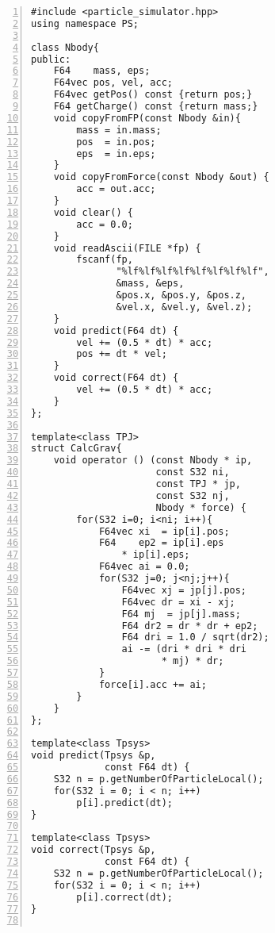 
\begin{lstlisting}[label=code:samplecode,numbers=left,numbersep=5pt,frame=single,basicstyle=\ttfamily]
#include <particle_simulator.hpp>
using namespace PS;

class Nbody{
public:
    F64    mass, eps;
    F64vec pos, vel, acc;
    F64vec getPos() const {return pos;}
    F64 getCharge() const {return mass;}
    void copyFromFP(const Nbody &in){ 
        mass = in.mass;
        pos  = in.pos;
        eps  = in.eps;
    }
    void copyFromForce(const Nbody &out) {
        acc = out.acc;
    }    
    void clear() {
        acc = 0.0;
    }
    void readAscii(FILE *fp) {
        fscanf(fp,
               "%lf%lf%lf%lf%lf%lf%lf%lf",
               &mass, &eps,
               &pos.x, &pos.y, &pos.z,
               &vel.x, &vel.y, &vel.z);
    }
    void predict(F64 dt) {
        vel += (0.5 * dt) * acc;
        pos += dt * vel;
    }
    void correct(F64 dt) {
        vel += (0.5 * dt) * acc;
    }
};

template<class TPJ>
struct CalcGrav{
    void operator () (const Nbody * ip,
                      const S32 ni,
                      const TPJ * jp,
                      const S32 nj,
                      Nbody * force) {
        for(S32 i=0; i<ni; i++){
            F64vec xi  = ip[i].pos;
            F64    ep2 = ip[i].eps
                * ip[i].eps;
            F64vec ai = 0.0;
            for(S32 j=0; j<nj;j++){
                F64vec xj = jp[j].pos;
                F64vec dr = xi - xj;
                F64 mj  = jp[j].mass;
                F64 dr2 = dr * dr + ep2;
                F64 dri = 1.0 / sqrt(dr2);                
                ai -= (dri * dri * dri
                       * mj) * dr;
            }
            force[i].acc += ai;
        }
    }
};

template<class Tpsys>
void predict(Tpsys &p,
             const F64 dt) {
    S32 n = p.getNumberOfParticleLocal();
    for(S32 i = 0; i < n; i++)
        p[i].predict(dt);
}

template<class Tpsys>
void correct(Tpsys &p,
             const F64 dt) {
    S32 n = p.getNumberOfParticleLocal();
    for(S32 i = 0; i < n; i++)
        p[i].correct(dt);
}


\end{lstlisting}
